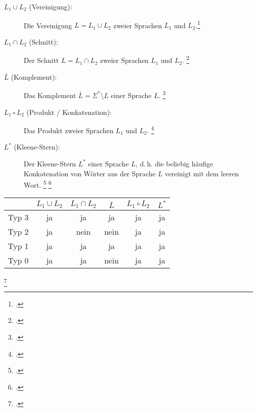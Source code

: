 \documentclass{lehramt-informatik-haupt}
\begin{document}
\begin{description}

%

\item[$L_1 \cup L_2$ (Vereinigung):]

Die Vereinigung $L = L_1 \cup L_2$ zweier Sprachen $L_1$ und
$L_2$.\footcite{wiki:menge}

%

\item[$L_1 \cap L_2$ (Schnitt):]

Der Schnitt $L = L_1 \cap L_2$ zweier Sprachen $L_1$ und $L_2$.
\footcite{wiki:menge}

%

\item[$\bar L$ (Komplement):]

Das Komplement $\bar L = \Sigma^* \setminus L$ einer Sprache
$L$.
\footcite{wiki:komplement}

%

\item[$L_1 \circ L_2$ (Produkt / Konkatenation):]

Das Produkt  zweier
Sprachen $L_1$ und $L_2$.
\footcite{wiki:formale-sprache}

%

\item[$L^*$ (Kleene-Stern):]

Der Kleene-Stern $L^*$ einer Sprache $L$, d.\,h. die beliebig
häufige Konkatenation von Wörter aus der Sprache $L$ vereinigt mit dem
leeren Wort.
\footcite[Seite 68]{theo:fs:1}
\footcite{wiki:kleensche-huelle}
\end{description}

{
\footnotesize
\begin{tabular}{r|c|c|c|c|c}
&
$L_1 \cup L_2$ &
$L_1 \cap L_2$  &
$\bar L$ &
$L_1 \circ L_2$ &
$L^*$ \\\hline
Typ 3 & ja   & ja   & ja   & ja   & ja \\
Typ 2 & ja   & nein & nein & ja   & ja \\
Typ 1 & ja   & ja   & ja   & ja   & ja \\
Typ 0 & ja   & ja   & nein & ja   & ja \\
\end{tabular}
}
\footcite[Seite 33]{theo:fs:1}

%
\end{document}
